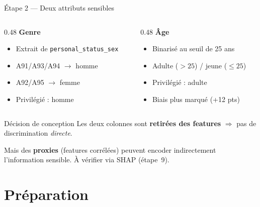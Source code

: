 \documentclass[aspectratio=169, 11pt]{beamer}
\begin{document}
\begin{frame}{\'Etape 2 --- Deux attributs sensibles}
\begin{columns}[T]
\begin{column}{0.48\textwidth}
\textbf{\textcolor{accent}{Genre}}
\begin{itemize}
    \item Extrait de \texttt{personal\_status\_sex}
    \item A91/A93/A94 $\to$ homme
    \item A92/A95 $\to$ femme
    \item Privil\'egi\'e : homme
\end{itemize}
\end{column}
\begin{column}{0.48\textwidth}
\textbf{\textcolor{fair}{\^Age}}
\begin{itemize}
    \item Binaris\'e au seuil de 25 ans
    \item Adulte ($> 25$) / jeune ($\leq 25$)
    \item Privil\'egi\'e : adulte
    \item Biais plus marqu\'e (+12 pts)
\end{itemize}
\end{column}
\end{columns}

\vspace{0.8em}
\begin{block}{D\'ecision de conception}
Les deux colonnes sont \textbf{retir\'ees des features} $\Rightarrow$ pas de discrimination \emph{directe}.

\vspace{0.2em}
Mais des \textbf{proxies} (features corr\'el\'ees) peuvent encoder indirectement l'information sensible. \`A v\'erifier via SHAP (\'etape~9).
\end{block}
\end{frame}

\section{Pr\'eparation}
\end{document}
